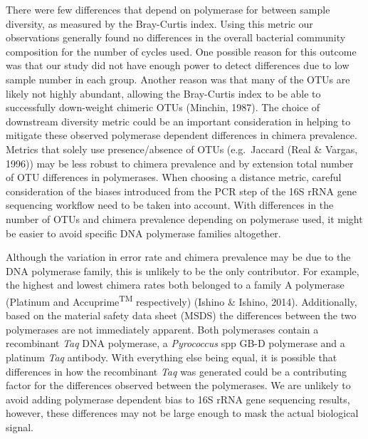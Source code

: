 \documentclass[12pt,]{article}
\begin{document}
There were few differences that depend on polymerase for between sample
diversity, as measured by the Bray-Curtis index. Using this metric our
observations generally found no differences in the overall bacterial
community composition for the number of cycles used. One possible reason
for this outcome was that our study did not have enough power to detect
differences due to low sample number in each group. Another reason was
that many of the OTUs are likely not highly abundant, allowing the
Bray-Curtis index to be able to successfully down-weight chimeric OTUs
(Minchin, 1987). The choice of downstream diversity metric could be an
important consideration in helping to mitigate these observed polymerase
dependent differences in chimera prevalence. Metrics that solely use
presence/absence of OTUs (e.g.~Jaccard (Real \& Vargas, 1996)) may be
less robust to chimera prevalence and by extension total number of OTU
differences in polymerases. When choosing a distance metric, careful
consideration of the biases introduced from the PCR step of the 16S rRNA
gene sequencing workflow need to be taken into account. With differences
in the number of OTUs and chimera prevalence depending on polymerase
used, it might be easier to avoid specific DNA polymerase families
altogether.

Although the variation in error rate and chimera prevalence may be due
to the DNA polymerase family, this is unlikely to be the only
contributor. For example, the highest and lowest chimera rates both
belonged to a family A polymerase (Platinum and
Accuprime\textsuperscript{TM} respectively) (Ishino \& Ishino, 2014).
Additionally, based on the material safety data sheet (MSDS) the
differences between the two polymerases are not immediately apparent.
Both polymerases contain a recombinant \emph{Taq} DNA polymerase, a
\emph{Pyrococcus} spp GB-D polymerase and a platinum \emph{Taq}
antibody. With everything else being equal, it is possible that
differences in how the recombinant \emph{Taq} was generated could be a
contributing factor for the differences observed between the
polymerases. We are unlikely to avoid adding polymerase dependent bias
to 16S rRNA gene sequencing results, however, these differences may not
be large enough to mask the actual biological signal.
\end{document}
